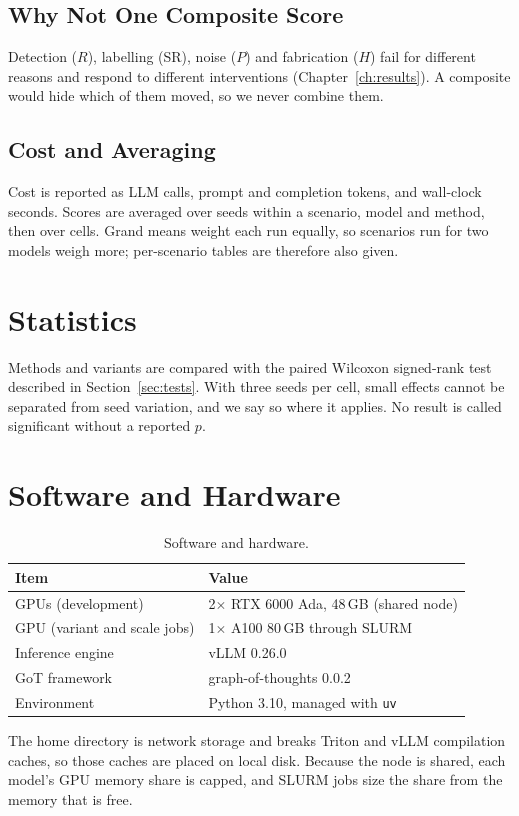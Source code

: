 \subsection{Why Not One Composite Score}
Detection ($R$), labelling (SR), noise ($P$) and fabrication ($H$) fail for different reasons and respond to different interventions (Chapter~\ref{ch:results}). A composite would hide which of them moved, so we never combine them.

\subsection{Cost and Averaging}
Cost is reported as LLM calls, prompt and completion tokens, and wall-clock seconds. Scores are averaged over seeds within a scenario, model and method, then over cells. Grand means weight each run equally, so scenarios run for two models weigh more; per-scenario tables are therefore also given.

\section{Statistics}
Methods and variants are compared with the paired Wilcoxon signed-rank test described in Section~\ref{sec:tests}. With three seeds per cell, small effects cannot be separated from seed variation, and we say so where it applies. No result is called significant without a reported $p$.

\section{Software and Hardware}
\begin{table}[H]
\centering
\caption{Software and hardware.}
\label{tab:software}
\small
\begin{tabularx}{\textwidth}{@{}>{\raggedright\arraybackslash}p{5.2cm} Y@{}}
\toprule
\textbf{Item} & \textbf{Value} \\
\midrule
GPUs (development) & 2$\times$ RTX 6000 Ada, 48\,GB (shared node) \\
GPU (variant and scale jobs) & 1$\times$ A100 80\,GB through SLURM \\
Inference engine & vLLM 0.26.0 \\
GoT framework & graph-of-thoughts 0.0.2 \\
Environment & Python 3.10, managed with \texttt{uv} \\
\bottomrule
\end{tabularx}
\end{table}
The home directory is network storage and breaks Triton and vLLM compilation caches, so those caches are placed on local disk. Because the node is shared, each model's GPU memory share is capped, and SLURM jobs size the share from the memory that is free.
